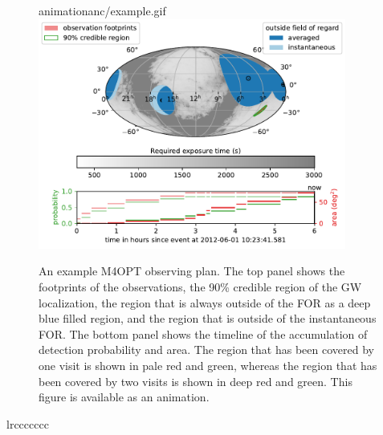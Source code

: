 \documentclass[twocolumn,times]{aastex631}
\begin{document}
\begin{figure}
    \begin{interactive}{animation}{anc/example.gif}
        \includegraphics[width=0.9\textwidth]{figures/example}
    \end{interactive}
    \caption{\label{fig:example}An example \ac{M4OPT} observing plan. The top panel shows the footprints of the observations, the 90\% credible region of the \ac{GW} localization, the region that is always outside of the \ac{FOR} as a deep blue filled region, and the region that is outside of the instantaneous \ac{FOR}. The bottom panel shows the timeline of the accumulation of detection probability and area. The region that has been covered by one visit is shown in pale red and green, whereas the region that has been covered by two visits is shown in deep red and green. This figure is available as an animation.}
\end{figure}

\begin{deluxetable*}{lrccccccc}
    \startdata
    
    \enddata
\end{deluxetable*}
\end{document}
